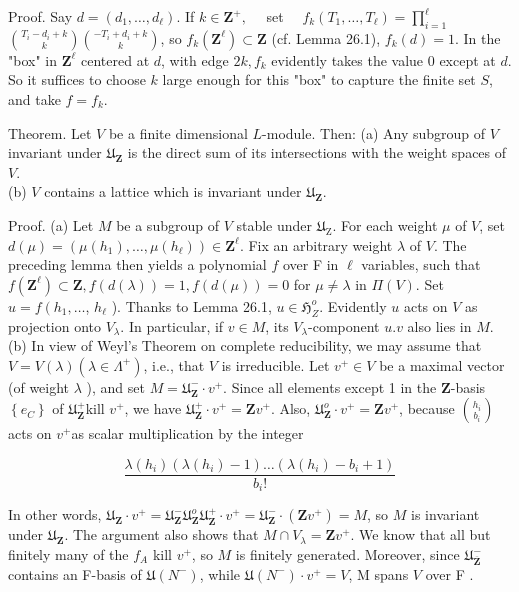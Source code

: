 \documentclass[10pt]{article}
\begin{document}
Proof. Say $d=\left(d_{1}, \ldots, d_{\ell}\right)$. If $k \in \mathbf{Z}^{+}, \quad$ set $\quad f_{k}\left(T_{1}, \ldots, T_{\ell}\right)=\prod_{i=1}^{\ell}$ $\binom{T_{i}-d_{i}+k}{k}\binom{-T_{i}+d_{i}+k}{k}$, so $f_{k}\left(\mathbf{Z}^{\ell}\right) \subset \mathbf{Z}$ (cf. Lemma 26.1), $f_{k}(d)=1$. In the "box" in $\mathbf{Z}^{\ell}$ centered at $d$, with edge $2 k, f_{k}$ evidently takes the value 0 except at $d$. So it suffices to choose $k$ large enough for this "box" to capture the finite set $S$, and take $f=f_{k}$.

Theorem. Let $V$ be a finite dimensional $L$-module. Then: (a) Any subgroup of $V$ invariant under $\mathfrak{U}_{\mathbf{Z}}$ is the direct sum of its intersections with the weight spaces of $V$.\\
(b) $V$ contains a lattice which is invariant under $\mathfrak{U}_{\mathbf{Z}}$.

Proof. (a) Let $M$ be a subgroup of $V$ stable under $\mathfrak{U}_{\mathrm{Z}}$. For each weight $\mu$ of $V$, set $d(\mu)=\left(\mu\left(h_{1}\right), \ldots, \mu\left(h_{\ell}\right)\right) \in \mathbf{Z}^{\ell}$. Fix an arbitrary weight $\lambda$ of $V$. The preceding lemma then yields a polynomial $f$ over F in $\ell$ variables, such that $f\left(\mathbf{Z}^{\ell}\right) \subset \mathbf{Z}, f(d(\lambda))=1, f(d(\mu))=0$ for $\mu \neq \lambda$ in $\Pi(V)$. Set $u=f\left(h_{1}, \ldots\right.$, $h_{\ell}$ ). Thanks to Lemma 26.1, $u \in \mathfrak{H}_{Z}^{o}$. Evidently $u$ acts on $V$ as projection onto $V_{\lambda}$. In particular, if $v \in M$, its $V_{\lambda}$-component $u . v$ also lies in $M$.\\
(b) In view of Weyl's Theorem on complete reducibility, we may assume that $V=V(\lambda)\left(\lambda \in \Lambda^{+}\right)$, i.e., that $V$ is irreducible. Let $v^{+} \in V$ be a maximal vector (of weight $\lambda$ ), and set $M=\mathfrak{U}_{\mathbf{Z}}^{-} \cdot v^{+}$. Since all elements except 1 in the $\mathbf{Z}$-basis $\left\{e_{C}\right\}$ of $\mathfrak{U}_{\mathbf{Z}}^{+}$kill $v^{+}$, we have $\mathfrak{U}_{\mathbf{Z}}^{+} \cdot v^{+}=\mathbf{Z} v^{+}$. Also, $\mathfrak{U}_{\mathbf{Z}}^{o} \cdot v^{+}=\mathbf{Z} v^{+}$, because $\binom{h_{i}}{b_{i}}$ acts on $v^{+}$as scalar multiplication by the integer

$$
\frac{\lambda\left(h_{i}\right)\left(\lambda\left(h_{i}\right)-1\right) \ldots\left(\lambda\left(h_{i}\right)-b_{i}+1\right)}{b_{i}!}
$$

In other words, $\mathfrak{U}_{\mathbf{Z}} \cdot v^{+}=\mathfrak{U}_{\mathbf{Z}}^{-} \mathfrak{U}_{\mathbf{Z}}^{o} \mathfrak{U}_{\mathbf{Z}}^{+} \cdot v^{+}=\mathfrak{U}_{\mathbf{Z}}^{-} \cdot\left(\mathbf{Z} v^{+}\right)=M$, so $M$ is invariant under $\mathfrak{U}_{\mathbf{Z}}$. The argument also shows that $M \cap V_{\lambda}=\mathbf{Z} v^{+}$. We know that all but finitely many of the $f_{A}$ kill $v^{+}$, so $M$ is finitely generated. Moreover, since $\mathfrak{U}_{\overline{\mathbf{Z}}}^{-}$contains an F-basis of $\mathfrak{U}\left(N^{-}\right)$, while $\mathfrak{U}\left(N^{-}\right) \cdot v^{+}=V$, M spans $V$ over F .
\end{document}
